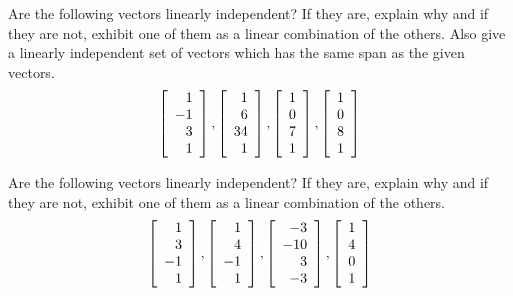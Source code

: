 \begin{enumialphparenastyle}
\begin{ex} Are the following vectors linearly independent? If they are, explain
why and if they are not, exhibit one of them as a linear combination of the
others. Also give a linearly independent set of vectors which has the same
span as the given vectors. 
\begin{equation*}
\left[ 
\begin{array}{r}
1 \\ 
-1 \\ 
3 \\ 
1
\end{array}
\right] ,\left[ 
\begin{array}{r}
1 \\ 
6 \\ 
34 \\ 
1
\end{array}
\right] ,\left[ 
\begin{array}{r}
1 \\ 
0 \\ 
7 \\ 
1
\end{array}
\right] ,\left[ 
\begin{array}{r}
1 \\ 
0 \\ 
8 \\ 
1
\end{array}
\right]
\end{equation*}
\end{ex}

\begin{ex} Are the following vectors linearly independent? If they are, explain
why and if they are not, exhibit one of them as a linear combination of the
others. 
\begin{equation*}
\left[ 
\begin{array}{r}
1 \\ 
3 \\ 
-1 \\ 
1
\end{array}
\right] ,\left[ 
\begin{array}{r}
1 \\ 
4 \\ 
-1 \\ 
1
\end{array}
\right] ,\left[ 
\begin{array}{r}
-3 \\ 
-10 \\ 
3 \\ 
-3
\end{array}
\right] ,\left[ 
\begin{array}{r}
1 \\ 
4 \\ 
0 \\ 
1
\end{array}
\right]
\end{equation*}
\end{ex}


\end{enumialphparenastyle}
